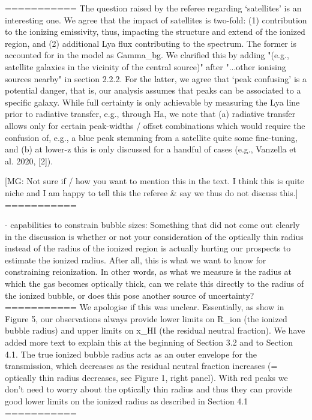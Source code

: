 ===========
The question raised by the referee regarding `satellites' is an interesting one. We agree that the impact of satellites is two-fold: (1) contribution to the ionizing emissivity, thus, impacting the structure and extend of the ionized region, and (2) additional Lya flux contributing to the spectrum.
The former is accounted for in the model as Gamma_bg. We clarified this by adding "(e.g., satellite galaxies in the vicinity of the central source)" after "...other ionising sources nearby" in section 2.2.2.
For the latter, we agree that `peak confusing' is a potential danger, that is, our analysis assumes that peaks can be associated to a specific galaxy. While full certainty is only achievable by measuring the Lya line prior to radiative transfer, e.g., through Ha, we note that (a) radiative transfer allows only for certain peak-widths / offset combinations which would require the confusion of, e.g., a blue peak stemming from a satellite quite some fine-tuning, and (b) at lower-z this is only discussed for a handful of cases (e.g., Vanzella et al. 2020, [2]). 

[MG: Not sure if / how you want to mention this in the text. I think this is quite niche and I am happy to tell this the referee & say we thus do not discuss this.]
===========

- capabilities to constrain bubble sizes:
Something that did not come out clearly in the discussion is whether or not your consideration of the optically thin radius instead of the radius of the ionized region is actually hurting our prospects to estimate the ionized radius. After all, this is what we want to know for constraining reionization. In other words, as what we measure is the radius at which the gas becomes optically thick, can we relate this directly to the radius of the ionized bubble, or does this pose another source of uncertainty?
===========
We apologise if this was unclear. Essentially, as show in Figure 5, our observations always provide lower limits on R_ion (the ionized bubble radius) and upper limits on x_HI (the residual neutral fraction). We have added more text to explain this at the beginning of Section 3.2 and to Section 4.1. The true ionized bubble radius acts as an outer envelope for the transmission, which decreases as the residual neutral fraction increases (= optically thin radius decreases, see Figure 1, right panel). With red peaks we don't need to worry about the optically thin radius and thus they can provide good lower limits on the ionized radius as described in Section 4.1
===========


